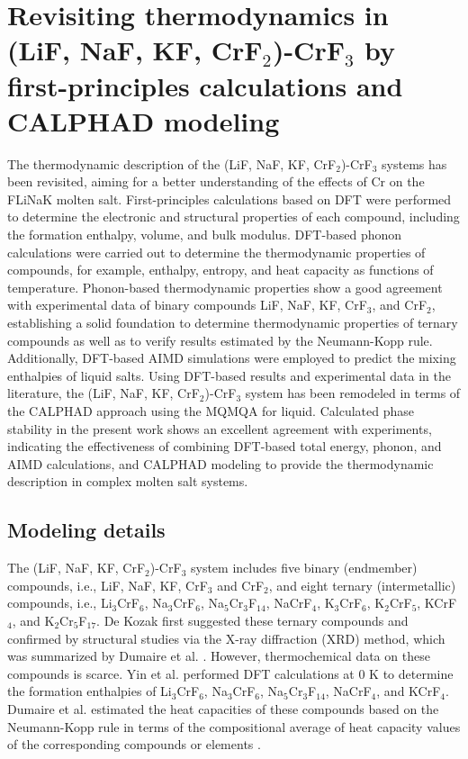 \section{Revisiting thermodynamics in (LiF, NaF, KF, CrF${_2}$)-CrF${_3}$ by first-principles calculations and CALPHAD modeling} \label{moltensalts:sec:FLiNaKCr}
The thermodynamic description of the (LiF, NaF, KF, CrF$_2$)-CrF$_3$ systems has been revisited, aiming for a better understanding of the effects of Cr on the FLiNaK molten salt. First-principles calculations based on DFT were performed to determine the electronic and structural properties of each compound, including the formation enthalpy, volume, and bulk modulus. DFT-based phonon calculations were carried out to determine the thermodynamic properties of compounds, for example, enthalpy, entropy, and heat capacity as functions of temperature. Phonon-based thermodynamic properties show a good agreement with experimental data of binary compounds LiF, NaF, KF, CrF$_3$, and CrF$_2$, establishing a solid foundation to determine thermodynamic properties of ternary compounds as well as to verify results estimated by the Neumann-Kopp rule. Additionally, DFT-based AIMD simulations were employed to predict the mixing enthalpies of liquid salts. Using DFT-based results and experimental data in the literature, the (LiF, NaF, KF, CrF$_2$)-CrF$_3$ system has been remodeled in terms of the CALPHAD approach using the MQMQA for liquid. Calculated phase stability in the present work shows an excellent agreement with experiments, indicating the effectiveness of combining DFT-based total energy, phonon, and AIMD calculations, and CALPHAD modeling to provide the thermodynamic description in complex molten salt systems.

\subsection{Modeling details} \label{moltensalts:ssec:FLiNaKCrmodel}
The (LiF, NaF, KF, CrF$_2$)-CrF$_3$ system includes five binary (endmember) compounds, i.e., LiF, NaF, KF, CrF$_3$ and CrF$_2$, and eight ternary (intermetallic) compounds, i.e., Li$_3$CrF$_6$, Na$_3$CrF$_6$, Na$_5$Cr$_3$F$_{14}$, NaCrF$_4$, K$_3$CrF$_6$, K$_2$CrF$_5$, KCrF$_4$, and K$_2$Cr$_5$F$_{17}$. De Kozak first suggested these ternary compounds \cite{DeKozak1969} and confirmed by structural studies \cite{de1975systeme,miranday1975croissance, sturm1962phase, garcia2014electrostatic, brunton1969crystal, le2003distorted, manaka2011effects, sassoye2006crystal} via the X-ray diffraction (XRD) method, which was summarized by Dumaire et al. \cite{dumaire2021thermodynamic}. However, thermochemical data on these compounds is scarce. Yin et al. \cite{yin2018thermodynamic, yin2015thermodynamic, yin2014thermodynamic} performed DFT calculations at 0 K to determine the formation enthalpies of Li$_3$CrF$_6$, Na$_3$CrF$_6$, Na$_5$Cr$_3$F$_{14}$, NaCrF$_4$, and KCrF$_4$. Dumaire et al. \cite{dumaire2021thermodynamic} estimated the heat capacities of these compounds based on the Neumann-Kopp rule in terms of the compositional average of heat capacity values of the corresponding compounds or elements \cite{leitner2010application}. 

